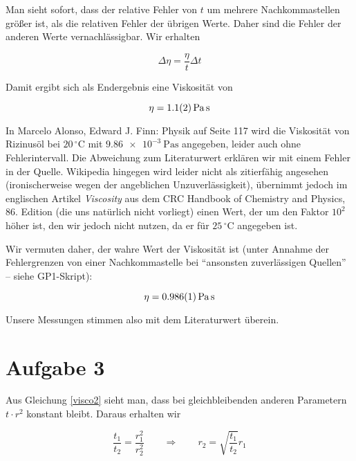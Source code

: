 \documentclass[a4paper,german,12pt,smallheadings]{scrartcl}
\begin{document}
Man sieht sofort, dass der relative Fehler von $t$ um mehrere Nachkommastellen
größer ist, als die relativen Fehler der übrigen Werte. Daher sind die Fehler
der anderen Werte vernachlässigbar. Wir erhalten

\begin{equation}
  \Delta \eta = \frac{\eta}{t} \Delta t
\end{equation}

Damit ergibt sich als Endergebnis eine Viskosität von

\begin{equation*}
  \eta = \SI{1.1+-0.2}{\pascal \second}
\end{equation*}

In Marcelo Alonso, Edward J. Finn: Physik auf Seite 117 wird die Viskosität von
Rizinusöl bei $20\,^{\circ}\mathrm{C}$ mit $\SI{9.86e-3}{\pascal \second}$
angegeben, leider auch ohne Fehlerintervall. Die Abweichung zum Literaturwert
erklären wir mit einem Fehler in der Quelle. Wikipedia hingegen wird leider
nicht als zitierfähig angesehen (ironischerweise wegen der angeblichen
Unzuverlässigkeit), übernimmt jedoch im englischen Artikel \textit{Viscosity}
aus dem CRC Handbook of Chemistry and Physics, 86. Edition (die uns natürlich
nicht vorliegt) einen Wert, der um den Faktor $10^2$ höher ist, den wir jedoch
nicht nutzen, da er für $25\,^{\circ}\mathrm{C}$ angegeben ist.

Wir vermuten daher, der wahre Wert der Viskosität ist (unter Annahme der
Fehlergrenzen von einer Nachkommastelle bei ``ansonsten zuverlässigen
Quellen'' -- siehe GP1-Skript):

\begin{equation*}
  \eta = \SI{0.986+-0.001}{\pascal \second}
\end{equation*}

Unsere Messungen stimmen also mit dem Literaturwert überein.

\section*{Aufgabe 3}

Aus Gleichung \ref{visco2} sieht man, dass bei gleichbleibenden anderen
Parametern $t \cdot r^2$ konstant bleibt. Daraus erhalten wir

\begin{equation}
  \frac{t_1}{t_2} = \frac{r_1^2}{r_2^2} \qquad \Rightarrow \qquad r_2 = \sqrt{\frac{t_1}{t_2}} r_1
\end{equation}
\end{document}
